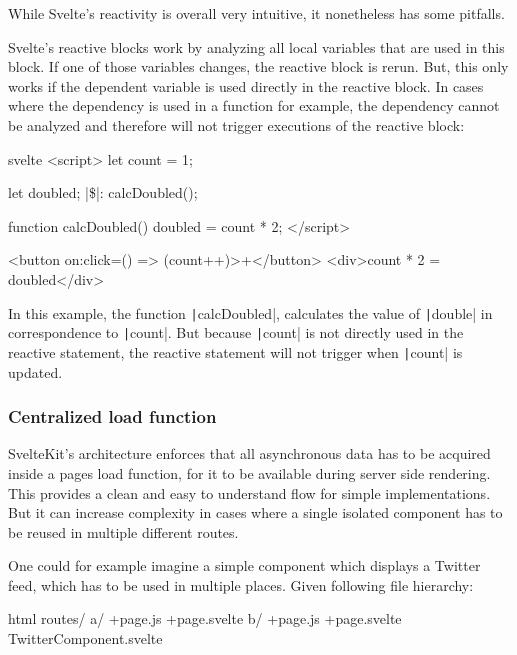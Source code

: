 While Svelte's reactivity is overall very intuitive, it nonetheless has some pitfalls.

Svelte's reactive blocks work by analyzing all local variables that are used in this block. If one of those variables changes, the reactive block is rerun. But, this only works if the dependent variable is used directly in the reactive block. In cases where the dependency is used in a function for example, the dependency cannot be analyzed and therefore will not trigger executions of the reactive block:

\begin{myminted}[escapeinside=||, autogobble]{svelte}{}
<script>
    let count = 1;

    let doubled;
    |\$|: calcDoubled();

    function calcDoubled() {
    doubled = count * 2;
    }
</script>

<button on:click={() => (count++)}>+</button>
<div>{count} * 2 = {doubled}</div>
\end{myminted}

In this example, the function \texttt|calcDoubled|, calculates the value of \texttt|double| in correspondence to \texttt|count|. But because \texttt|count| is not directly used in the reactive statement, the reactive statement will not trigger when \texttt|count| is updated.

\subsubsection{Centralized load function}

SvelteKit's architecture enforces that all asynchronous data has to be acquired inside a pages load function, for it to be available during server side rendering. This provides a clean and easy to understand flow for simple implementations. But it can increase complexity in cases where a single isolated component has to be reused in multiple different routes.

One could for example imagine a simple component which displays a Twitter feed, which has to be used in multiple places. Given following file hierarchy:

\begin{myminted}{html}{}
routes/
    a/
        +page.js
        +page.svelte
    b/
        +page.js
        +page.svelte
    TwitterComponent.svelte
\end{myminted}

